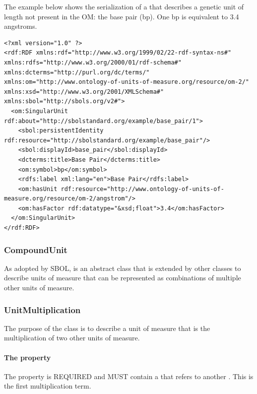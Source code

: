 The example below shows the serialization of a  that describes a genetic unit of length not present in the OM: the base pair (bp). One bp is equivalent to 3.4 angstroms.

\begin{lstlisting}
<?xml version="1.0" ?>
<rdf:RDF xmlns:rdf="http://www.w3.org/1999/02/22-rdf-syntax-ns#" xmlns:rdfs="http://www.w3.org/2000/01/rdf-schema#" xmlns:dcterms="http://purl.org/dc/terms/" xmlns:om="http://www.ontology-of-units-of-measure.org/resource/om-2/" xmlns:xsd="http://www.w3.org/2001/XMLSchema#" xmlns:sbol="http://sbols.org/v2#">
  <om:SingularUnit rdf:about="http://sbolstandard.org/example/base_pair/1">
    <sbol:persistentIdentity rdf:resource="http://sbolstandard.org/example/base_pair"/>
    <sbol:displayId>base_pair</sbol:displayId>
    <dcterms:title>Base Pair</dcterms:title>
    <om:symbol>bp</om:symbol>
    <rdfs:label xml:lang="en">Base Pair</rdfs:label>
    <om:hasUnit rdf:resource="http://www.ontology-of-units-of-measure.org/resource/om-2/angstrom"/>
    <om:hasFactor rdf:datatype="&xsd;float">3.4</om:hasFactor>
  </om:SingularUnit>
</rdf:RDF>
\end{lstlisting}
\label{ser:SingularUnit}


\subsubsection{CompoundUnit}
\label{sec:CompoundUnit}


As adopted by SBOL,  is an abstract class that is extended by other classes to describe units of measure that can be represented as combinations of multiple other units of measure.


\subsubsection{UnitMultiplication}
\label{sec:UnitMultiplication}

The purpose of the  class is to describe a unit of measure that is the multiplication of two other units of measure. 

\paragraph{The  property}\label{sec:hasTerm1}
The  property is REQUIRED and MUST contain a  that refers to another . This  is the first multiplication term.

